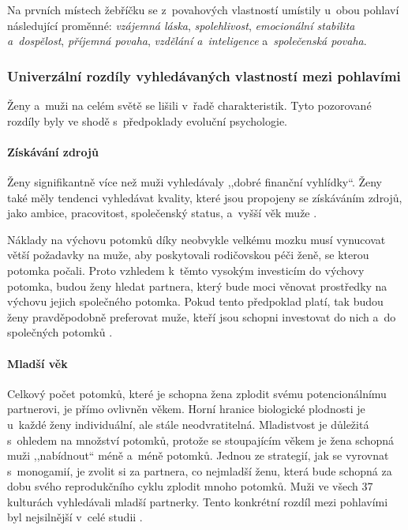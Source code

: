 \documentclass[a4paper, 12pt, notitlepage, oneside, numbers=noenddot]{report}
\begin{document}
Na prvních místech žebříčku se z~povahových vlastností umístily u~obou
pohlaví následující proměnné: \emph{vzájemná láska},
\emph{spolehlivost}, \emph{emocionální stabilita a~dospělost},
\emph{pří\-jem\-ná povaha}, \emph{vzdělání a~inteligence}
a~\emph{společenská povaha}.

\subsubsection{Univerzální rozdíly vyhledávaných vlastností mezi pohlavími}

Ženy a~muži na celém světě se lišili v~řadě charakteristik.  Tyto
pozorované rozdíly byly ve shodě s~předpoklady evoluční psychologie.

\paragraph{Získávání zdrojů}

Ženy signifikantně více než muži vyhledávaly ,,dobré finanční
vy\-hlí\-dky``.  Ženy také měly tendenci vyhledávat kvality, které jsou
propojeny se získáváním zdrojů, jako ambice, pracovitost, společenský
status, a~vyšší věk muže \citep{Buss2007}.

Náklady na výchovu potomků díky neobvykle velkému mozku musí vynucovat
větší požadavky na muže, aby poskytovali rodičovskou péči ženě, se
kterou potomka počali.  Proto vzhledem k~těmto vysokým investicím do
výchovy potomka, budou ženy hledat partnera, který bude moci věnovat
prostředky na výchovu jejich společného potomka.  Pokud tento
předpoklad platí, tak budou ženy pravděpodobně preferovat muže, kteří
jsou schopni investovat do nich a~do společných potomků
\citep{Trivers1972,Ridley2007}.

\paragraph{Mladší věk}

Celkový počet potomků, které je schopna žena zplodit svému
poten\-cionál\-ní\-mu partnerovi, je přímo ovlivněn věkem.  Horní hranice
biologické plodnosti je u~každé ženy individuální, ale stále
neodvratitelná.  Mladistvost je důležitá s~ohledem na množství
potomků, protože se stoupajícím věkem je žena schopná muži
,,nabídnout`` méně a~méně potomků.  Jednou ze strategií, jak se
vyrovnat s~monogamií, je zvolit si za partnera, co nejmladší ženu,
která bude schopná za dobu svého reprodukčního cyklu zplodit mnoho
potomků.  Muži ve všech 37 kulturách vyhledávali mladší partnerky.
Tento konkrétní rozdíl mezi pohlavími byl nejsilnější v~celé studii
\citep{BussEtAl1990, Buss2007}.
\end{document}
